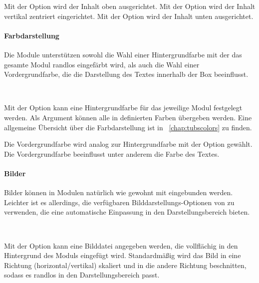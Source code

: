 Mit der Option  wird der Inhalt oben ausgerichtet.
Mit der Option  wird der Inhalt vertikal zentriert eingerichtet.
Mit der Option  wird der Inhalt unten ausgerichtet.

\paragraph{Farbdarstellung}\hfill

Die Module unterstützen sowohl die Wahl einer Hintergrundfarbe mit der das
gesamte Modul randlos eingefärbt wird, als auch die Wahl einer
Vordergrundfarbe, die die Darstellung des Textes innerhalb der Box beeinflusst.

\begin{Declaration}
  \\
\end{Declaration}

Mit der Option  kann eine Hintergrundfarbe für das
jeweilige Modul festgelegt werden. Als Argument können alle in \tubslatex
definierten Farben übergeben werden.
Eine allgemeine Übersicht über die Farbdarstellung ist in
\chaptername~\ref{chap:tubscolors} zu finden.

Die Vordergrundfarbe wird analog zur Hintergrundfarbe mit der
Option  gewählt.
Die Vordergrundfarbe beeinflusst unter anderem die Farbe des Textes.

\paragraph{Bilder}\hfill

Bilder können in Modulen natürlich wie gewohnt mit 
eingebunden werden.
Leichter ist es allerdings, die verfügbaren Bilddarstellungs-Optionen
von \tubslatex zu verwenden, die eine automatische Einpassung in den
Darstellungsbereich bieten.

\begin{Declaration}
  \\
\end{Declaration}

Mit der Option  kann eine Bilddatei angegeben werden,
die vollflächig in den Hintergrund des Moduls eingefügt wird.
Standardmäßig wird das Bild in eine Richtung (horizontal/vertikal) skaliert
und in die andere Richtung beschnitten,
sodass es randlos in den Darstellungsbereich passt.

